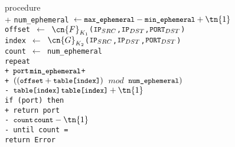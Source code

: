
\begin{algorithm}{}{\thetcbcounter}\label{alg:dhps_port_selection}
	\begin{pseudo}[indent-mark,kw,hl-warn=false]
		procedure  \\+
		\tt{num\_ephemeral} $\leftarrow \tt{max\_ephemeral} - \tt{min\_ephemeral}+\tn{1}$ \\
    \tt{offset} $\leftarrow$ $\cn{F}_{K_1}$($\tt{IP}_{SRC}$,$\tt{IP}_{DST}$,$\tt{PORT}_{DST}$) \\
    \tt{index} $\leftarrow$ $\cn{G}_{K_2}$($\tt{IP}_{SRC}$,$\tt{IP}_{DST}$,$\tt{PORT}_{DST}$) \\
		\tt{count} $\leftarrow$ \tt{num\_ephemeral} \\
		repeat \\+
		$\tt{port} $\leftarrow$ \tt{min\_ephemeral}$+\\+
		$((\tt{offset}+\tt{table[index]})$ $mod$ $\tt{num\_ephemeral})$ \\-
		$\tt{table[index]} $\leftarrow$ \tt{table[index]} +\tn{1}$ \\
		if (\tt{port}) then \\+
		return \tt{port} \\-
		$\tt{count} $\leftarrow$ \tt{count} - \tn{1}$ \\-
		until \tt{count} =  \\
		return \tt{Error}\\
	\end{pseudo}
\end{algorithm}
